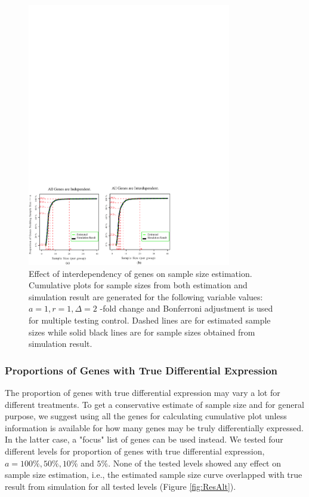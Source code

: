 \documentclass{bioinfo}
\begin{document}
\begin{figure}[h]
  \centerline{\includegraphics*[width=3.5in]{ResDepF.pdf}}
  \caption[Effect of interdependency of genes on sample size estimation]
  {Effect of interdependency of genes on sample size estimation.
    Cumulative plots for sample sizes from both estimation and simulation result
    are generated for the following variable values: $a = 1, r = 1, \Delta = 2$ -fold change
    and Bonferroni adjustment is used for multiple testing control. Dashed lines are for estimated sample sizes
    while solid black lines are for sample sizes obtained from simulation result.}
  \label{fig:ResDep}
\end{figure}

\subsubsection{Proportions of Genes with True Differential Expression}
The proportion of genes with true differential expression may vary
a lot for different treatments. To get a conservative estimate of
sample size and for general purpose, we suggest using all the
genes for calculating cumulative plot unless information is
available for how many genes may be truly differentially
expressed. In the latter case, a "focus" list of genes can be used
instead. We tested four different levels for proportion of genes
with true differential expression, $a = 100\%, 50\%, 10\%$ and
$5\%$. None of the tested levels showed any effect on sample size
estimation, i.e., the estimated sample size curve overlapped with
true result from simulation for all tested levels (Figure
\ref{fig:ResAlt}).
\end{document}
